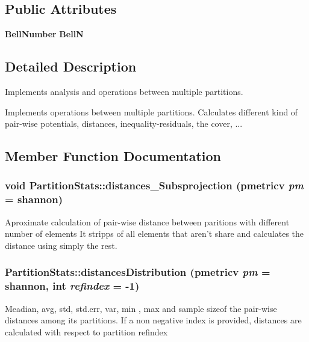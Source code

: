 \subsection*{Public Attributes}
\begin{CompactItemize}
\item 
{\bf Bell\-Number} {\bf Bell\-N}\label{classPartitionStats_o0}

\end{CompactItemize}


\subsection{Detailed Description}
Implements analysis and operations between multiple partitions. 

Implements operations between multiple partitions. Calculates different kind of pair-wise potentials, distances, inequality-residuals, the cover, ... 



\subsection{Member Function Documentation}
\subsubsection{\setlength{\rightskip}{0pt plus 5cm}void Partition\-Stats::distances\_\-Subsprojection (pmetricv {\em pm} = shannon)}\label{classPartitionStats_a45}


Aproximate calculation of pair-wise distance between paritions with different number of elements It stripps of all elements that aren't share and calculates the distance using simply the rest. 
\subsubsection{ Partition\-Stats::distances\-Distribution (pmetricv {\em pm} = shannon, int {\em refindex} = -1)}\label{classPartitionStats_a44}


Meadian, avg, std, std.err, var, min , max and sample sizeof the pair-wise distances among its partitions. If a non negative index is provided, distances are calculated with respect to partition refindex
